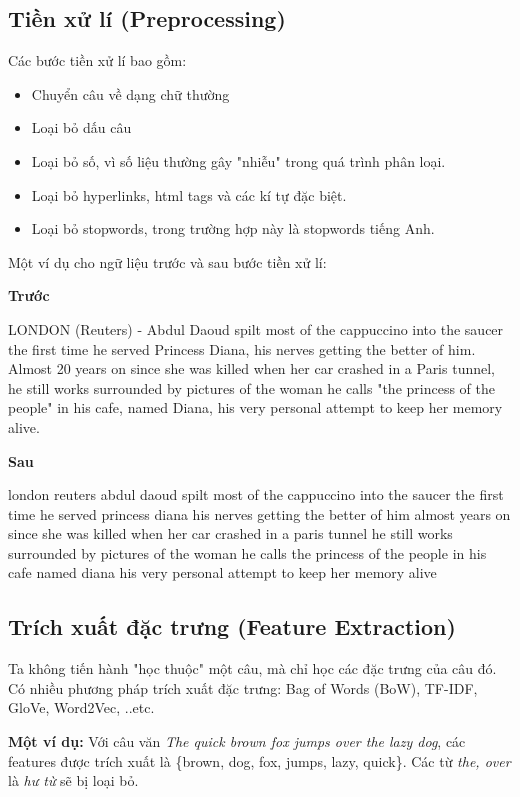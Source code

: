 \documentclass[12pt]{article}
\begin{document}
\subsection{Tiền xử lí (Preprocessing)}
Các bước tiền xử lí bao gồm:
\begin{itemize}
\item Chuyển câu về dạng chữ thường
\item Loại bỏ dấu câu
\item Loại bỏ số, vì số liệu thường gây "nhiễu" trong quá trình phân loại.
\item Loại bỏ hyperlinks, html tags và các kí tự đặc biệt.
\item Loại bỏ stopwords, trong trường hợp này là stopwords tiếng Anh.
\end{itemize}

Một ví dụ cho ngữ liệu trước và sau bước tiền xử lí:
\begin{multicols}{2}
\textbf{Trước}

LONDON (Reuters) - Abdul Daoud spilt most of the cappuccino into the saucer the first time he served Princess Diana, his nerves getting the better of him. Almost 20 years on since she was killed when her car crashed in a Paris tunnel, he still works surrounded by pictures of the woman he calls "the princess of the people" in his cafe, named Diana, his very personal attempt to keep her memory alive.

\textbf{Sau}

london  reuters    abdul daoud spilt most of the cappuccino into the saucer the first time he served princess diana  his nerves getting the better of him  almost  years on since she was killed when her car crashed in a paris tunnel  he still works surrounded by pictures of the woman he calls  the princess of the people  in his cafe  named diana  his very personal attempt to keep her memory alive
\end{multicols}

\subsection{Trích xuất đặc trưng (Feature Extraction)}
Ta không tiến hành "học thuộc" một câu, mà chỉ học các đặc trưng của câu đó. Có nhiều phương pháp trích xuất đặc trưng: Bag of Words (BoW), TF-IDF, GloVe, Word2Vec, ..etc.

\textbf{Một ví dụ:} Với câu văn \textit{The quick brown fox jumps over the lazy dog}, các features được trích xuất là \{brown, dog, fox, jumps, lazy, quick\}. Các từ \textit{the, over} là \textit{hư từ} sẽ bị loại bỏ.
\end{document}
